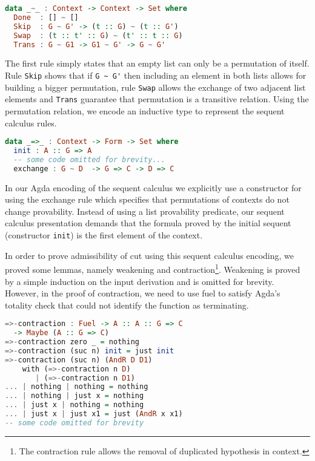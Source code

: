 \begin{lstlisting}[language=haskell]
data _~_ : Context -> Context -> Set where
  Done  : [] ~ []
  Skip  : G ~ G' -> (t :: G) ~ (t :: G')
  Swap  : (t :: t' :: G) ~ (t' :: t :: G)
  Trans : G ~ G1 -> G1 ~ G' -> G ~ G'
\end{lstlisting}

The first rule simply states that an empty list can only be a permutation of itself. Rule \lstinline|Skip|
shows that if \lstinline|G ~ G'| then including an element in both lists allows for building a bigger
permutation, rule \lstinline|Swap| allows the exchange of two adjacent list elements and \lstinline|Trans|
guarantee that permutation is a transitive relation. Using the permutation relation, we encode an
inductive type to represent the sequent calculus rules.

\begin{lstlisting}[language=haskell]
data _=>_ : Context -> Form -> Set where
  init : A :: G => A
  -- some code omitted for brevity...
  exchange : G ~ D  -> G => C -> D => C
\end{lstlisting}

In our Agda encoding of the sequent calculus we explicitly use a constructor for using the exchange rule
which specifies that permutations of contexts do not change provability. Instead of using a list provability
predicate, our sequent calculus presentation demands that the formula proved by the initial sequent
(constructor \lstinline|init|) is the first element of the context.


In order to prove admissibility of cut using this sequent calculus encoding, we proved some lemmas, namely weakening
and contraction\footnote{The contraction rule allows the removal of duplicated hypothesis in context.}. Weakening is
proved by a simple induction on the input derivation and is omitted for brevity. However, in the proof of contraction,
 we need to use fuel to satisfy Agda's totality check that could not identify the function as terminating.

\begin{lstlisting}[language=haskell]
=>-contraction : Fuel -> A :: A :: G => C
  -> Maybe (A :: G => C)
=>-contraction zero _ = nothing
=>-contraction (suc n) init = just init
=>-contraction (suc n) (AndR D D1)
    with (=>-contraction n D)
       | (=>-contraction n D1)
... | nothing | nothing = nothing
... | nothing | just x = nothing
... | just x | nothing = nothing
... | just x | just x1 = just (AndR x x1)
-- some code omitted for brevity
\end{lstlisting}

